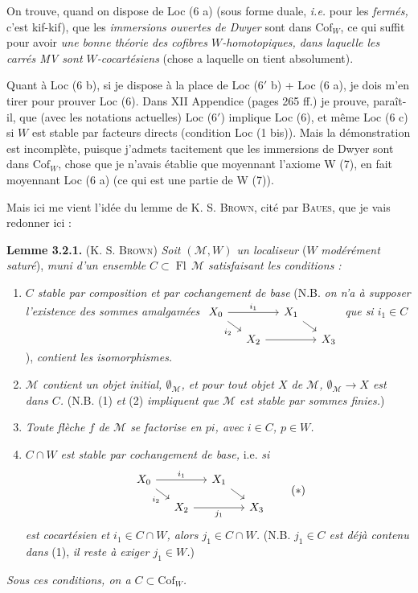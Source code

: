 \documentclass[11pt]{article}
\newcommand{\printedpage}[1]{\marginpar{\footnotesize p.~#1}}
\newcommand{\msp}[1]{\marginpar{\footnotesize [#1]}}
\newcommand{\Fl}{\operatorname{Fl}}
\newcommand{\Cof}{\mathrm{Cof}}
\begin{document}
\msp{page 19}On trouve, quand on dispose de Loc (6 a) (sous forme duale, \textit{i.e.} pour les \textit{fermés,} c'est kif-kif), que les \textit{immersions ouvertes de Dwyer} sont dans $\Cof_W$, ce qui suffit pour avoir \textit{une bonne théorie des cofibres $W$-homotopiques, dans laquelle les carrés MV sont $W$-cocartésiens} (chose a laquelle on tient absolument). %

Quant à Loc (6 b), si je dispose à la place de Loc (6$'$ b) + Loc (6 a), je dois m'en tirer pour prouver Loc (6). Dans XII Appendice (pages 265 ff.) je prouve, paraît-il, que (avec les notations actuelles) Loc (6$'$) implique Loc (6), et même Loc (6 c) si $W$ est stable par facteurs directs (condition Loc (1 bis)). Mais la démonstration est incomplète, puisque j'admets tacitement que les immersions de Dwyer sont dans $\Cof_W$, chose que je n'avais établie que moyennant l'axiome W (7), en fait moyennant Loc (6 a) (ce qui est une partie de W (7)).

\msp{page 20}Mais ici me vient l'idée du lemme de K. S. \textsc{Brown}, cité par \textsc{Baues}, que je vais redonner ici :

\textbf{Lemme 3.2.1.} (K. S. \textsc{Brown}) \textit{Soit $(\mathcal{M}, W)$ un localiseur} ($W$ \textit{modérément saturé}), \textit{muni d'un ensemble $C \subset \Fl\,\mathcal{M}$ satisfaisant les conditions :}
\begin{enumerate}
\item[1)] \textit{$C$ stable par composition et par cochangement de base} (N.B. \textit{on n'a à supposer l'existence des sommes amalgamées}
$\begin{tikzcd}[ampersand replacement=\&, baseline=(\tikzcdmatrixname-1-1.base), row sep=small, column sep=small]
X_0 \arrow[rr, "i_1"] \arrow[dr, "i_2"'] \& \& X_1 \arrow[dr] \& \\
\& X_2 \arrow[rr] \& \& X_3
\end{tikzcd}$
\textit{que si $i_1 \in C$}), \textit{contient les isomorphismes.}
\item[2)] \textit{$\mathcal{M}$ contient un objet initial, $\emptyset_{\mathcal{M}}$, et pour tout objet $X$ de $\mathcal{M}$, $\emptyset_{\mathcal{M}} \longrightarrow X$ est dans $C$.} (N.B. (1) \textit{et} (2) \textit{impliquent que $\mathcal{M}$ est stable par sommes finies.})
\item[3)] \textit{Toute flèche $f$ de $\mathcal{M}$ se factorise en $pi$, avec $i \in C$, $p \in W$.}
\item[4)] \textit{$C \cap W$ est stable par cochangement de base,} i.e. \textit{si}
\[
\begin{tikzcd}[ampersand replacement=\&, row sep=small, column sep=small]
X_0 \arrow[rr, "i_1"] \arrow[dr, "i_2"'] \& \& X_1 \arrow[dr] \& \\
\& X_2 \arrow[rr, "j_1"'] \& \& X_3
\end{tikzcd}
\tag*{$(*)$}
\]
\printedpage{15}
\textit{est cocartésien et $i_1 \in C \cap W$, alors $j_1 \in C \cap W$.} (N.B. \textit{$j_1 \in C$ est déjà contenu dans} (1), \textit{il reste à exiger $j_1 \in W$.})
\end{enumerate}
\textit{Sous ces conditions, on a $C \subset \Cof_W$.}
\end{document}
